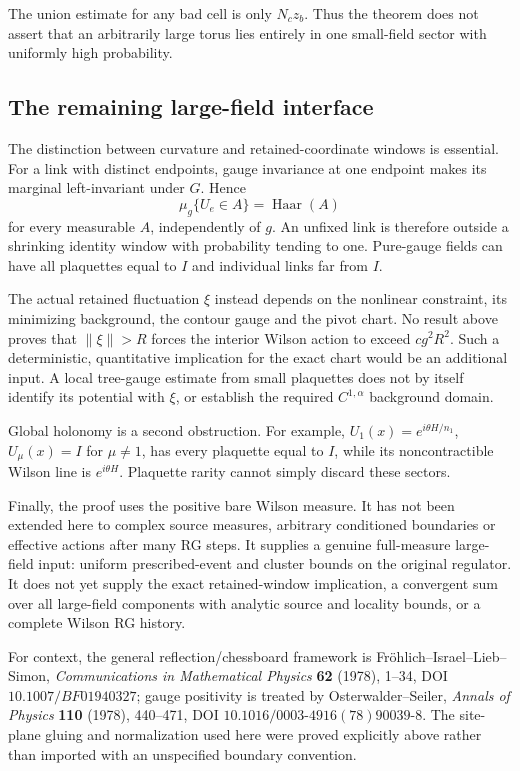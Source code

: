 The union estimate for any bad cell is only \(N_c z_b\).
Thus the theorem does not assert that an arbitrarily large torus lies
entirely in one small-field sector with uniformly high probability.

\subsection{The remaining large-field interface}
\label{fwp-scope}

The distinction between curvature and retained-coordinate windows is
essential. For a link with distinct endpoints, gauge invariance at one
endpoint makes its marginal left-invariant under \(G\). Hence
\begin{equation}
 \mu_g\{U_e\in A\}=\operatorname{Haar}(A)
 \label{fwp-haar-marginal}
\end{equation}
for every measurable \(A\), independently of \(g\).
An unfixed link is therefore outside a shrinking identity window with
probability tending to one. Pure-gauge fields can have all plaquettes
equal to \(I\) and individual links far from \(I\).

The actual retained fluctuation \(\xi\) instead depends on the nonlinear
constraint, its minimizing background, the contour gauge and the pivot
chart. No result above proves that \(\|\xi\|>R\) forces the interior
Wilson action to exceed \(c g^2R^2\). Such a deterministic, quantitative
implication for the exact chart would be an additional input.
A local tree-gauge estimate from small plaquettes does not by itself
identify its potential with \(\xi\), or establish the required
\(C^{1,\alpha}\) background domain.

Global holonomy is a second obstruction. For example,
\(U_1(x)=e^{i\theta H/n_1}\), \(U_\mu(x)=I\) for \(\mu\ne1\),
has every plaquette equal to \(I\), while its noncontractible Wilson
line is \(e^{i\theta H}\). Plaquette rarity cannot simply discard these
sectors.

Finally, the proof uses the positive bare Wilson measure. It has not
been extended here to complex source measures, arbitrary conditioned
boundaries or effective actions after many RG steps. It supplies a
genuine full-measure large-field input: uniform prescribed-event and
cluster bounds on the original regulator. It does not yet supply the
exact retained-window implication, a convergent sum over all large-field
components with analytic source and locality bounds, or a complete
Wilson RG history.

For context, the general reflection/chessboard framework is
Fr\"ohlich--Israel--Lieb--Simon, \emph{Communications in Mathematical
Physics} \textbf{62} (1978), 1--34,
DOI \(10.1007/BF01940327\); gauge positivity is treated by
Osterwalder--Seiler, \emph{Annals of Physics} \textbf{110} (1978),
440--471, DOI \(10.1016/0003\text{-}4916(78)90039\text{-}8\).
The site-plane gluing and normalization used here were proved explicitly
above rather than imported with an unspecified boundary convention.

